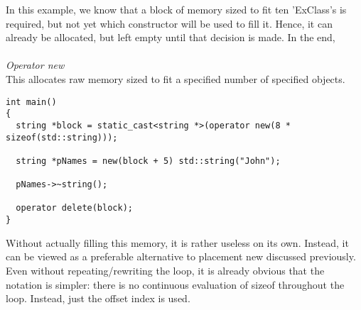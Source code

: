 In this example, we know that a block of memory sized to fit ten 'ExClass's is required, but not yet which constructor will be used to fill it. Hence, it can already be allocated, but left empty until that decision is made. In the end, \\
\\
\textit{Operator new} \\
This allocates raw memory sized to fit a specified number of specified objects.
\begin{lstlisting}[style=inline]
int main()
{
  string *block = static_cast<string *>(operator new(8 * sizeof(std::string)));

  string *pNames = new(block + 5) std::string("John");

  pNames->~string();

  operator delete(block);
}
\end{lstlisting}

Without actually filling this memory, it is rather useless on its own. Instead, it can be viewed as a preferable alternative to placement new discussed previously. Even without repeating/rewriting the loop, it is already obvious that the notation is simpler: there is no continuous evaluation of sizeof throughout the loop. Instead, just the offset index is used.
